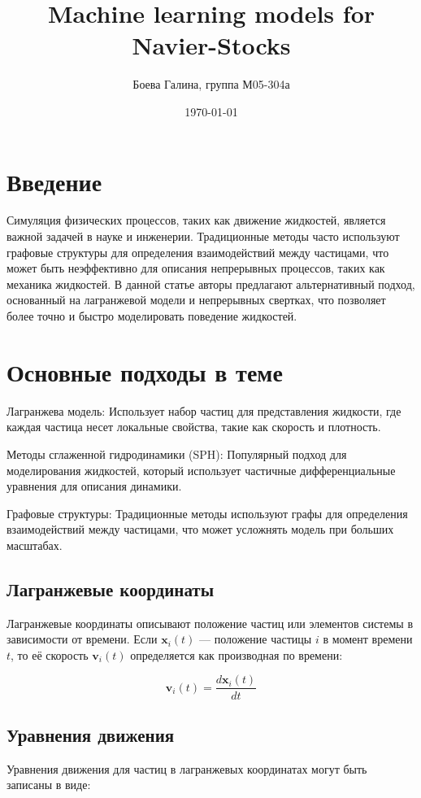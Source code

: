 \documentclass[a4paper,12pt]{article}
\theoremstyle{plain} %
\theoremstyle{definition} %
\theoremstyle{remark} %
\begin{document}
\title{Machine learning models for Navier-Stocks}
\author{Боева Галина, группа М05-304а}
\date{\today}

\maketitle
\section{Введение}
Симуляция физических процессов, таких как движение жидкостей, является важной задачей в науке и инженерии. Традиционные методы часто используют графовые структуры для определения взаимодействий между частицами, что может быть неэффективно для описания непрерывных процессов, таких как механика жидкостей. В данной статье авторы предлагают альтернативный подход, основанный на лагранжевой модели и непрерывных свертках, что позволяет более точно и быстро моделировать поведение жидкостей.
\section{Основные подходы в теме}
Лагранжева модель: Использует набор частиц для представления жидкости, где каждая частица несет локальные свойства, такие как скорость и плотность.

Методы сглаженной гидродинамики (SPH): Популярный подход для моделирования жидкостей, который использует частичные дифференциальные уравнения для описания динамики.

Графовые структуры: Традиционные методы используют графы для определения взаимодействий между частицами, что может усложнять модель при больших масштабах.
\subsection{Лагранжевые координаты}
Лагранжевые координаты описывают положение частиц или элементов системы в зависимости от времени. Если $\mathbf{x}_i(t)$ — положение частицы $i$ в момент времени $t$, то её скорость $\mathbf{v}_i(t)$ определяется как производная по времени:

\begin{equation}
\mathbf{v}_i(t) = \frac{d\mathbf{x}_i(t)}{dt}
\end{equation}

\subsection{Уравнения движения}
Уравнения движения для частиц в лагранжевых координатах могут быть записаны в виде:
\end{document}
